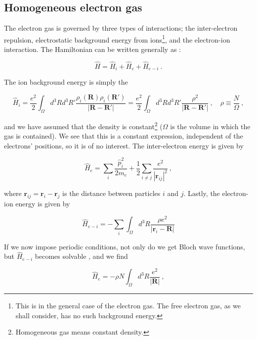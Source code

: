 \documentclass[10pt,twoside]{report}
\begin{document}
	\subsection{Homogeneous electron gas}
	The electron gas is governed by three types of interactions; the inter-electron repulsion, electrostatic background energy from ions\footnote{This is in the general case of the electron gas. The free electron gas, as we shall consider, has no such background energy.}, and the electron-ion interaction. The Hamiltonian can be written generally as \cite{GrossRungeHeinonen91}:
	
	\begin{equation}
		\hat{H} = \hat{H}_i + \hat{H}_e + \hat{H}_{e-i} \:.
	\end{equation}
	
	The ion background energy is simply the 
	
	\begin{equation}
		\hat{H}_i = \frac{e^2}{2}\int_{\Omega}d^3Rd^3R' \frac{\rho_i(\bm{R})\rho_i(\bm{R}')}{|\bm{R}-\bm{R}'|} = \frac{e^2}{2}\int_{\Omega}d^3Rd^3R' \frac{\rho^2}{|\bm{R}-\bm{R}'|} \: ,\quad \rho \equiv \frac{N}{\Omega}\:,
	\end{equation}
	
	\noindent and we have assumed that the density is constant\footnote{Homogeneous gas means constant density.} ($\Omega$ is the volume in which the gas is contained). We see that this is a constant expression, independent of the electrons' positions, so it is of no interest. The inter-electron energy is given by
	
	\begin{equation}
		\hat{H}_e = \sum_i \frac{\hat{p}_i^2}{2m_e} + \frac{1}{2}\sum_{i\neq j} \frac{e^2}{|\bm{r}_{ij}|^2}\:,
	\end{equation}
	
	\noindent where $\bm{r}_{ij} = \bm{r}_i - \bm{r}_j$ is the distance between particles $i$ and $j$. Lastly, the electron-ion energy is given by
	
	\begin{equation}
		\hat{H}_{e-i} = -\sum_{i}\int_{\Omega}d^3R\frac{\rho e^2}{|\bm{r}_i-\bm{R}|}
	\end{equation}
	
	If we now impose periodic conditions, not only do we get Bloch wave functions, but $\hat{H}_{e-i}$ becomes solvable \cite{GrossRungeHeinonen91}, and we find \cite{GrossRungeHeinonen91}
	
	\begin{equation}
		\hat{H}_e = -\rho N\int_{\Omega}d^3R \frac{e^2}{|\bm{R}|}\:,
	\end{equation}
	
\end{document}
